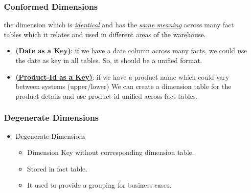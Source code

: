 \VideoClassification[column=1, colour=blue]
\begin{frame}
    \frametitle{Conformed Dimensions}
    \begin{description}[<+->]
        \item[Conformed Dimensions]    the dimension which is \underline{\textit{identical}} and has the \underline{\textit{same meaning}} across many fact tables which it relates and used in different areas of the warehouse.
        \begin{example}
            \begin{itemize}[<+->]
                \item \underline{\textbf{(Date as a Key)}}: if we have a date column across many facts, we could use the date as key in all tables. So, it should be a unified format.
                \item \underline{\textbf{(Product-Id as a Key)}}: if we have a product name which could vary between systems
                \forexample (upper/lower) We can create a dimension table for the product details and use product id unified across fact tables.
            \end{itemize}
        \end{example}
    \end{description}
\end{frame}
\VideoClassification[column=1, colour=blue]
\begin{frame}
	\frametitle{Degenerate Dimensions}
	\begin{itemize}[<+->]
		\item Degenerate Dimensions
		\begin{itemize}[<+->]
			\item Dimension Key without corresponding dimension table.%
			\item Stored in fact table.
			\item It used to provide a grouping for business cases.
		\end{itemize}
	\end{itemize}
\end{frame}
